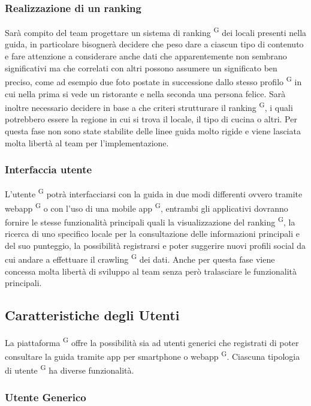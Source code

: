 \subsubsection{Realizzazione di un ranking}
Sarà compito del team progettare un sistema di ranking \textsuperscript{G} dei locali presenti nella guida, in particolare bisognerà decidere che peso dare a ciascun tipo di contenuto e fare attenzione a considerare anche dati che apparentemente non sembrano significativi ma che correlati con altri possono assumere un significato ben preciso, come ad esempio due foto postate in successione dallo stesso profilo \textsuperscript{G} in cui nella prima si vede un ristorante e nella seconda una persona felice. Sarà inoltre necessario decidere in base a che criteri strutturare il ranking \textsuperscript{G}, i quali potrebbero essere la regione in cui si trova il locale, il tipo di cucina o altri. Per questa fase non sono state stabilite delle linee guida molto rigide e viene lasciata molta libertà al team per l’implementazione.

\subsubsection{Interfaccia utente}
L’utente \textsuperscript{G} potrà interfacciarsi con la guida in due modi differenti ovvero tramite webapp \textsuperscript{G} o con l’uso di una mobile app \textsuperscript{G}, entrambi gli applicativi dovranno fornire le stesse funzionalità principali quali la visualizzazione del ranking \textsuperscript{G}, la ricerca di uno specifico locale per la consultazione delle informazioni principali e del suo punteggio, la possibilità registrarsi e poter suggerire nuovi profili social da cui andare a effettuare il crawling \textsuperscript{G} dei dati.
Anche per questa fase viene concessa molta libertà di sviluppo al team senza però tralasciare le funzionalità principali.

\subsection{Caratteristiche degli Utenti}

La piattaforma \textsuperscript{G} offre la possibilità sia ad utenti generici che registrati di poter consultare la guida tramite app per smartphone o webapp \textsuperscript{G}. Ciascuna tipologia di utente \textsuperscript{G} ha diverse funzionalità.

\subsubsection{Utente Generico}

